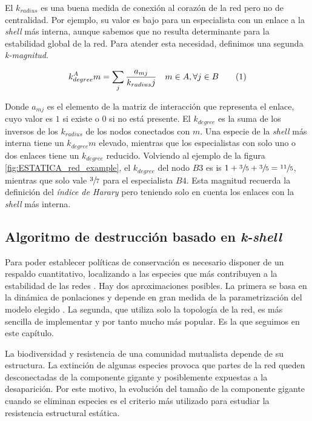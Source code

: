 El ${k}_{radius}$ es una buena medida de conexión al corazón de la red pero no de centralidad. Por ejemplo, su valor es bajo para un especialista con un enlace a la \textit{shell} más interna, aunque sabemos que no resulta determinante para la estabilidad global de la red. Para atender esta necesidad, definimos una segunda \textit{k-magnitud}.

\begin{theo} 
\begin{align*}
\displaystyle
k^A_{degree}m = \sum\limits_{j} \frac{a_{mj} }{k_{radius}j}  \quad   m \in A, \forall j \in B
\stepcounter{equation}\tag{\theequation}
\end{align*}
\label{kdegree}
\end{theo}

Donde $a_{mj}$ es el elemento de la matriz de interacción que representa el enlace, cuyo valor es $1$ si existe o $0$ si no está presente. El $k_{degree}$ es la suma de los inversos de los $k_{radius}$ de los nodos conectados con $m$. Una especie de la \textit{shell} más interna tiene un $k_{degree}m$ elevado,  mientras que los especialistas con solo uno o dos enlaces tiene un $k_{degree}$ reducido. Volviendo al ejemplo de la figura \ref{fig:ESTATICA_red_example}, el $k_{degree}$ del nodo $B3$ es is $1+\sfrac{3}{5}+\sfrac{3}{5} = \sfrac{11}{5}$, mientras que solo vale $\sfrac{3}{7}$ para el especialista $B4$. Esta magnitud recuerda la definición del \textit{índice de Harary} \cite{plavvsic1993harary} pero teniendo solo en cuenta los enlaces con la \textit{shell} más interna.


\subsection{Algoritmo de destrucción basado en \textit{k-shell}}

Para poder establecer políticas de conservación es necesario disponer de un respaldo cuantitativo, localizando a las especies que más contribuyen a la estabilidad de las redes \cite{sole2001fragility, dakos2015resilience, thebault2010stability, suweis2013emergence, santamaria2015removing}.  Hay dos aproximaciones posibles. La primera se basa en la dinámica de ponlaciones y depende en gran medida de la parametrización del modelo elegido \cite{dakos2014critical}. La segunda, que utiliza solo la topología de la red, es más sencilla de implementar y por tanto mucho más popular. Es la que seguimos en este capítulo.

La biodiversidad y resistencia de una comunidad mutualista depende de su estructura. La extinción de algunas especies provoca que partes de la red queden desconectadas de la componente gigante y posiblemente expuestas a la desaparición. Por este motivo, la evolución del tamaño de la componente gigante cuando se eliminan especies es el criterio más utilizado para estudiar la resistencia estructural estática.

